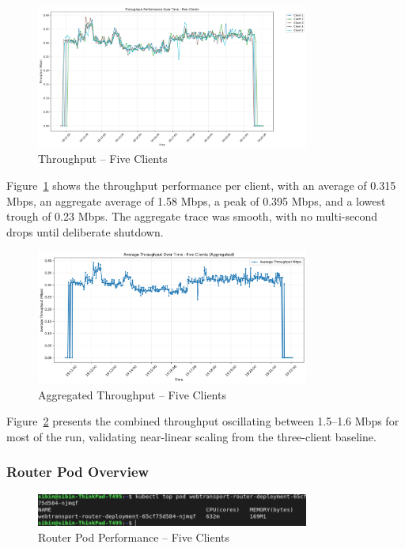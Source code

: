 \begin{figure}[h!]
\centering
\includegraphics[width=0.8\textwidth]{Evaluation/throughput_by_client_five-clients.png}
\caption{Throughput – Five Clients}
\label{fig:throughput-five-clients}
\end{figure}
Figure~\ref{fig:throughput-five-clients} shows the throughput performance per client, with an average of 0.315 Mbps, an aggregate average of 1.58 Mbps, a peak of 0.395 Mbps, and a lowest trough of 0.23 Mbps. The aggregate trace was smooth, with no multi-second drops until deliberate shutdown.
\begin{figure}[h!]
\centering
\includegraphics[width=0.8\textwidth]{Evaluation/avg_throughput_aggregated_five-clients.png}
\caption{Aggregated Throughput – Five Clients}
\label{fig:avg-throughput-aggregated-five}
\end{figure}
Figure~\ref{fig:avg-throughput-aggregated-five} presents the combined throughput oscillating between 1.5–1.6 Mbps for most of the run, validating near-linear scaling from the three-client baseline.

\subsubsection{Router Pod Overview}
\begin{figure}[h!]
\centering
\includegraphics[width=0.8\textwidth]{Evaluation/five-clients-pod-stats.png}
\caption{Router Pod Performance – Five Clients}
\label{fig:router-pod-five-clients}
\end{figure}

